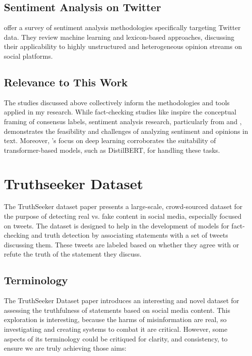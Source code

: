 \documentclass[14]{article}
\begin{document}
\subsection{Sentiment Analysis on Twitter}
\citet{twitter_sentiment_analysis} offer a survey of sentiment analysis methodologies specifically targeting Twitter data. They review machine learning and lexicon-based approaches, discussing their applicability to highly unstructured and heterogeneous opinion streams on social platforms.

\subsection{Relevance to This Work}
The studies discussed above collectively inform the methodologies and tools applied in my research. While fact-checking studies like \citet{fact_check_fact_checker} inspire the conceptual framing of consensus labels, sentiment analysis research, particularly from \citet{sentiment_opinion_mining} and \citet{twitter_sentiment_analysis}, demonstrates the feasibility and challenges of analyzing sentiment and opinions in text. Moreover, \citet{sentiment_deep_learning}'s focus on deep learning corroborates the suitability of transformer-based models, such as DistilBERT, for handling these tasks.

\section{Truthseeker Dataset}

The TruthSeeker dataset paper presents a large-scale, crowd-sourced dataset for the purpose of detecting real vs. fake content in social media, especially focused on tweets. The dataset is designed to help in the development of models for fact-checking and truth detection by associating statements with a set of tweets discussing them. These tweets are labeled based on whether they agree with or refute the truth of the statement they discuss.

\subsection{Terminology}
The TruthSeeker Dataset paper \cite{truthseeker} introduces an interesting and novel dataset for assessing the truthfulness of statements based on social media content. This exploration is interesting, because the harms of misinformation are real, so investigating and creating systems to combat it are critical. However, some aspects of its terminology could be critiqued for clarity, and consistency, to ensure we are truly achieving those aims:
\end{document}
